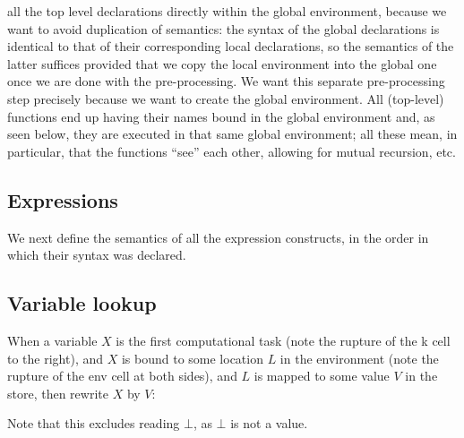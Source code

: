 \documentclass{article}
\begin{document}
\begin{kdefinition}
\begin{module}{}
\begin{kblock}[text]
all the top level declarations directly within the global environment, because
we want to avoid duplication of semantics: the syntax of the global
declarations is identical to that of their corresponding local declarations,
so the semantics of the latter suffices provided that we copy the local
environment into the global one once we are done with the pre-processing.
We want this separate pre-processing step precisely because we want to create
the global environment.  All (top-level) functions end up having their names
bound in the global environment and, as seen below, they are executed in that
same global environment; all these mean, in particular, that the functions
``see'' each other, allowing for mutual recursion, etc. \end{kblock}

\begin{syntaxBlock}{}
\end{syntaxBlock}
\begin{kblock}[text]
 \section{Expressions}
We next define the \K semantics of all the expression constructs, in the
order in which their syntax was declared. \end{kblock}
\begin{kblock}[text]
 \subsection{Variable lookup}
When a variable $X$ is the first computational task (note the rupture of the
\textsf{k} cell to the right), and $X$ is bound to some location $L$ in the
environment (note the rupture of the \textsf{env} cell at both sides), and
$L$ is mapped to some value $V$ in the store, then rewrite $X$ by $V$: \end{kblock}
\begin{kblock}[text]
 Note that this excludes reading $\bot$, as $\bot$ is not a value. \end{kblock}
\begin{kblock}[text]

\end{kblock}
\end{module}
\end{kdefinition}
\end{document}
